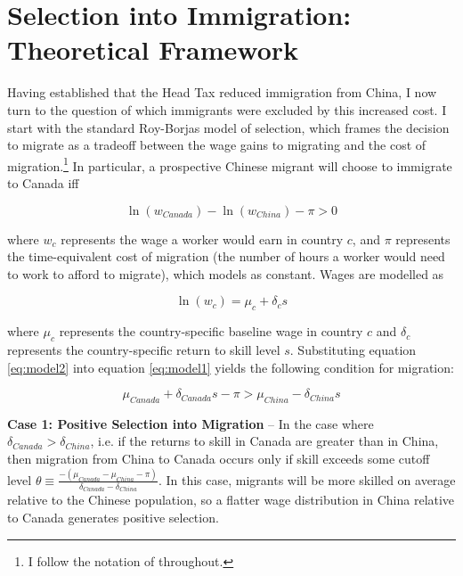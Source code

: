 \section{Selection into Immigration: Theoretical Framework}
Having established that the Head Tax reduced immigration from China, I now turn to the question of which immigrants were excluded by this increased cost. I start with the standard Roy-Borjas model of selection, which frames the decision to migrate as a tradeoff between the wage gains to migrating and the cost of migration.\footnote{I follow the notation of \citet{chiquiarhanson2005} throughout.} In particular, a prospective Chinese migrant will choose to immigrate to Canada iff

\begin{equation}
    \label{eq:model1}
    \ln (w_{Canada}) - \ln(w_{China}) - \pi > 0
\end{equation}

where $w_c$ represents the wage a worker would earn in country $c$, and $\pi$ represents the time-equivalent cost of migration (the number of hours a worker would need to work to afford to migrate), which \citet{borjas1987} models as constant. Wages are modelled as

\begin{equation}
    \label{eq:model2}
    \ln (w_c) = \mu_c + \delta_c s
\end{equation}

where $\mu_c$ represents the country-specific baseline wage in country $c$ and $\delta_c$ represents the country-specific return to skill level $s$. Substituting equation \ref{eq:model2} into equation \ref{eq:model1} yields the following condition for migration:

\begin{equation}
    \label{eq:model3}
    \mu_{Canada} + \delta_{Canada}s - \pi > \mu_{China} - \delta_{China}s
\end{equation}

\textbf{Case 1: Positive Selection into Migration} -- In the case where $\delta_{Canada} > \delta_{China}$, i.e. if the returns to skill in Canada are greater than in China, then migration from China to Canada occurs only if skill exceeds some cutoff level $\theta \equiv \frac{ -(\mu_{Canada}-\mu_{China}-\pi)}{\delta_{Canada} - \delta_{China}}$. In this case, migrants will be more skilled on average relative to the Chinese population, so a flatter wage distribution in China relative to Canada generates positive selection.

